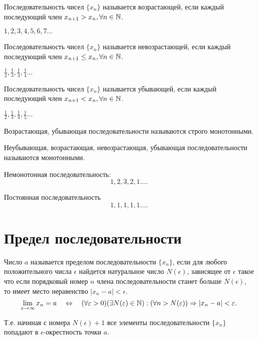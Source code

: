 \begin{definition}
  Последовательность чисел $\{x_{n}\} $ называется возрастающей, если каждый последующий член $x_{n+1} > x_{n}, \forall n \in \mathbb{N}$.
\end{definition}
\begin{eg}
  $1, 2, 3, 4, 5, 6, 7\ldots$
\end{eg}

\begin{definition}
  Последовательность чисел $\{x_{n}\} $ называется невозрастающей, если каждый последующий член $x_{n+1} \le x_{n}, \forall n \in \mathbb{N}$.
\end{definition}
\begin{eg}
  $\frac{1}{2}, \frac{1}{3}, \frac{1}{3}, \frac{1}{4}\ldots $
\end{eg}

\begin{definition}
  Последовательность чисел $\{x_{n}\} $ называется убывающей, если каждый последующий член $x_{n+1} < x_{n}, \forall n \in \mathbb{N}$.
\end{definition}
\begin{eg}
  $\frac{1}{2}, \frac{1}{3}, \frac{1}{4}, \frac{1}{5}\ldots$
\end{eg}

\begin{definition}
  Возрастающая, убывающая последовательности называются строго монотонными.
\end{definition}

\begin{definition}
  Неубывающая, возрастающая, невозрастающая, убывающая последовательности называются монотонными.
\end{definition}

Немонотонная последовательность:
\[
1, 2, 3, 2, 1\ldots
.\] 

Постоянная последовательность
\[
1, 1, 1, 1, 1\ldots
.\] 

\section{Предел последовательности}

\begin{definition}
Число $a$ называется пределом последовательности $\{x_{n}\} $, если для любого положительного числа $\epsilon$ найдется натуральное число  $N\left(\epsilon  \right) $, зависящее от $\epsilon$ такое что если порядковый номер $n$ члена последовательности станет больше $N(\epsilon)$, то имеет место неравенство  $|x_{n} - a| < \epsilon$.
\[
\lim_{x \to \infty} x_{n} = a \quad \iff \quad
(\forall \epsilon > 0)(\exists N(\epsilon) \in \N) : (\forall n > N(\epsilon)) \implies |x_{n}-a| < \epsilon
.\] 
\end{definition}
\begin{note}
  Т.е. начиная с номера $N(\epsilon) + 1$ все элементы последовательности $\{x_{n}\} $ попадают в $\epsilon$-окрестность точки $a$.
\end{note}

